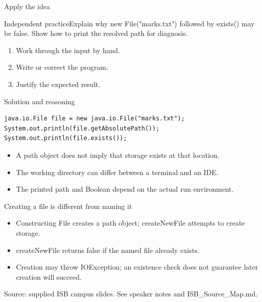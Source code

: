 \documentclass[10pt,aspectratio=169]{beamer}
\begin{document}
\begin{frame}[fragile,t]{Apply the idea}
\begin{alertblock}{Independent practice}Explain why new File("marks.txt") followed by exists() may be false. Show how to print the resolved path for diagnosis.\end{alertblock}\vspace{3mm}\begin{enumerate}\item Work through the input by hand.\item Write or correct the program.\item Justify the expected result.\end{enumerate}
\end{frame}

\begin{frame}[fragile,t]{Solution and reasoning}
\begin{lstlisting}
java.io.File file = new java.io.File("marks.txt");
System.out.println(file.getAbsolutePath());
System.out.println(file.exists());
\end{lstlisting}\vspace{1mm}\small\begin{itemize}
\item A path object does not imply that storage exists at that location.
\item The working directory can differ between a terminal and an IDE.
\item The printed path and Boolean depend on the actual run environment.
\end{itemize}
\end{frame}

\begin{frame}[fragile,t]{Creating a file is different from naming it}
\begin{itemize}
\item Constructing File creates a path object; createNewFile attempts to create storage.
\item createNewFile returns false if the named file already exists.
\item Creation may throw IO\allowbreak Exception; an existence check does not guarantee later creation will succeed.
\end{itemize}
\vspace{3mm}\footnotesize\textcolor{accent}{Source: supplied ISB campus slides. See speaker notes and ISB\_Source\_Map.md.}
\end{frame}
\end{document}
